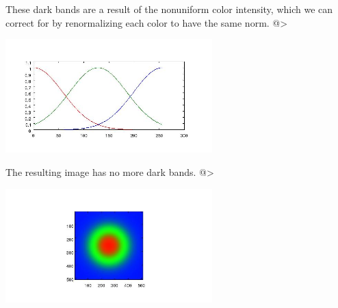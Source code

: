 These dark bands are a result of the nonuniform color intensity, which 
we can correct for by renormalizing each color to have the same norm.
@>


\centerline{\includegraphics[width=8cm]{colormap6}}


The resulting image has no more dark bands.
@>


\centerline{\includegraphics[width=8cm]{colormap7}}

